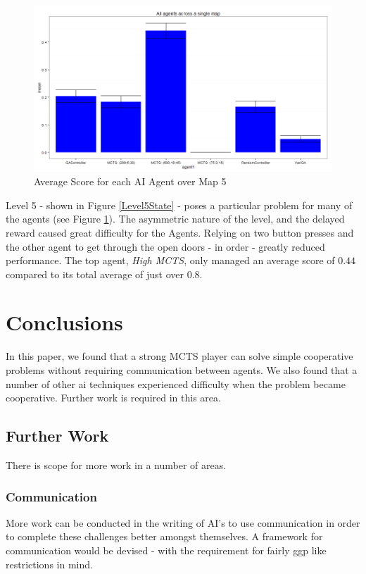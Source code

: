 \documentclass{IEEEtran}
\begin{document}
\begin{figure}[ht]
\centering
\includegraphics[width = \linewidth]{level5-txt-scores}
\caption{Average Score for each AI Agent over Map 5}
\label{avgScoreMap5}
\end{figure}

Level 5 - shown in Figure \ref{Level5State} - poses a particular problem for many of the agents (see Figure \ref{avgScoreMap5}). The asymmetric nature of the level, and the delayed reward caused great difficulty for the Agents. Relying on two button presses and the other agent to get through the open doors - in order - greatly reduced performance. The top agent, \emph{High MCTS}, only managed an average score of $0.44$ compared to its total average of just over $0.8$.

\section{Conclusions}
In this paper, we found that a strong MCTS player can solve simple cooperative problems without requiring communication between agents. We also found that a number of other \gls{ai} techniques experienced difficulty when the problem became cooperative. Further work is required in this area.

\subsection{Further Work}
There is scope for more work in a number of areas.

\subsubsection{Communication}
More work can be conducted in the writing of AI's to use communication in order to complete these challenges better amongst themselves. A framework for communication would be devised - with the requirement for fairly \gls{ggp} like restrictions in mind.
\end{document}
